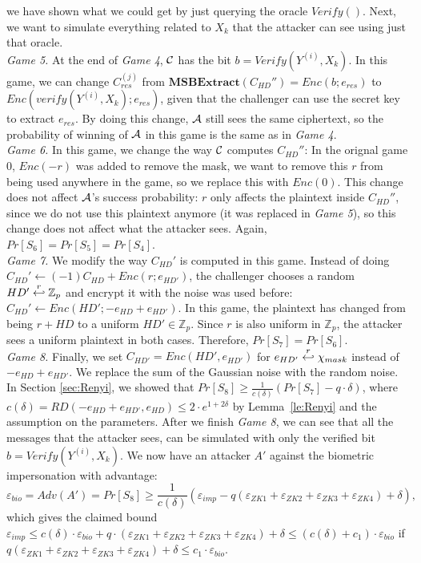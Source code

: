 we have shown what we could get by just querying the oracle $Verify()$. Next,
we want to simulate everything related to $X_k$ that the attacker can see using
just that oracle.\\
\textit{Game 5.} At the end of \textit{Game 4}, $\mathcal{C}$ has the bit
$b = Verify(Y^{(i)},X_k)$. In this game, we can change $C_{res}^{(j)}$ from
$\mathbf{MSBExtract}(C_{HD}'') = Enc(b;e_{res})$ to
$Enc(verify(Y^{(i)},X_k);e_{res})$, given that the challenger can use the
secret key to extract $e_{res}$. By doing this change, $\mathcal{A}$ still sees
the same ciphertext, so the probability of winning of $\mathcal{A}$ in this game
is the same as in \textit{Game 4}.\\
\textit{Game 6.} In this game, we change the way $\mathcal{C}$ computes
$C_{HD}''$: In the orignal game 0, $Enc(-r)$ was added to remove the mask, we
want to remove this $r$ from being used anywhere in the game, so we replace
this with $Enc(0)$. This change does not affect $\mathcal{A}$'s success
probability: $r$ only affects the plaintext inside $C_{HD}''$, since we do not
use this plaintext anymore (it was replaced in \textit{Game 5}), so this change
does not affect what the attacker sees. Again, $Pr[S_6] = Pr[S_5] = Pr[S_4]$.\\
\textit{Game 7.} We modify the way $C_{HD}'$ is computed in this game. Instead
of doing $C_{HD}' \gets (-1)C_{HD} + Enc(r;e_{HD'})$, the challenger chooses a
random $HD' \stackrel{r}{\hookleftarrow} \mathbb{Z}_p$ and encrypt it with the noise was used
before: $C_{HD}' \gets Enc(HD'; -e_{HD} + e_{HD'})$. In this game, the
plaintext has changed from being $r + HD$ to a uniform $HD' \in \mathbb{Z}_p$.
Since $r$ is also uniform in $\mathbb{Z}_p$, the attacker sees a uniform
plaintext in both cases. Therefore, $Pr[S_7] = Pr[S_6]$.\\
\textit{Game 8.} Finally, we set $C_{HD'} = Enc(HD', e_{HD'})$ for $e_{HD'}
\stackrel{r}{\hookleftarrow} \chi_{mask}$ instead of $-e_{HD} + e_{HD'}$. We replace the sum
of the Gaussian noise with the random noise. In Section \ref{sec:Renyi}, we
showed that $Pr[S_8] \geq \frac{1}{c(\delta)}(Pr[S_7]-q \cdot \delta)$, where $c(\delta) = RD(-e_{HD} + e_{HD'},
e_{HD}) \leq 2 \cdot e^{1+2\delta}$ by Lemma~\ref{le:Renyi} and the assumption on the parameters. After we finish \textit{Game 8}, we can see that all the messages
that the attacker sees, can be simulated with only the verified bit $b =
Verify(Y^{(i)}, X_k)$. We now have an attacker $A'$ against the biometric
impersonation with advantage:
\[
\varepsilon_{bio} = Adv(A') = Pr[S_8] \geq \frac{1}{c(\delta)}(\varepsilon_{imp} - q(\varepsilon_{ZK1}+\varepsilon_{ZK2} +
\varepsilon_{ZK3} + \varepsilon_{ZK4}) + \delta),
\]
which gives the claimed bound $\varepsilon_{imp} \leq c(\delta) \cdot \varepsilon_{bio} + q \cdot (\varepsilon_{ZK1}+\varepsilon_{ZK2} +
\varepsilon_{ZK3} + \varepsilon_{ZK4}) + \delta \leq (c(\delta)+c_1) \cdot \varepsilon_{bio}$ if $q(\varepsilon_{ZK1}+\varepsilon_{ZK2} +
\varepsilon_{ZK3} + \varepsilon_{ZK4}) + \delta \leq c_1 \cdot \varepsilon_{bio}$.


